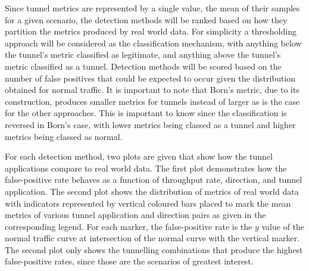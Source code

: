 \documentclass[12pt]{report}
\theoremstyle{remark}
\theoremstyle{definition}
\theoremstyle{definition}
\theoremstyle{definition}
\begin{document}
Since tunnel metrics are represented by a single value, the mean of their
samples for a given scenario, the detection methods will be ranked based on how
they partition the metrics produced by real world data. For simplicity a
thresholding approach will be considered as the classification mechanism, with
anything below the tunnel's metric classified as legitimate, and anything above
the tunnel's metric classified as a tunnel. Detection methods will be scored
based on the number of false positives that could be expected to occur given the
distribution obtained for normal traffic. It is important to note that Born's
metric, due to its construction, produces smaller metrics for tunnels instead of
larger as is the case for the other approaches. This is important to know since
the classification is reversed in Born's case, with lower metrics being classed
as a tunnel and higher metrics being classed as normal.

For each detection method, two plots are given that show how the tunnel
applications compare to real world data. The first plot demonstrates how the
false-positive rate behaves as a function of throughput rate, direction, and
tunnel application. The second plot shows the distribution of metrics of real
world data with indicators represented by vertical coloured bars placed to mark
the mean metrics of various tunnel application and direction pairs as given in
the corresponding legend. For each marker, the false-positive rate is the $y$
value of the normal traffic curve at intersection of the normal curve with the
vertical marker. The second plot only shows the tunnelling combinations that
produce the highest false-positive rates, since those are the scenarios of
greatest interest.
\end{document}
